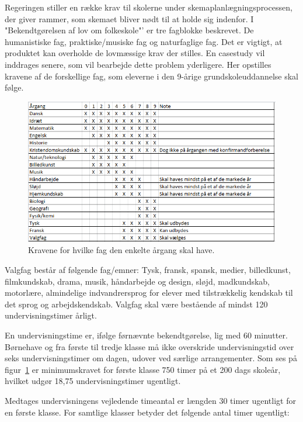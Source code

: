 Regeringen stiller en række krav til skolerne under skemaplanlægningsprocessen, der giver rammer, som skemaet bliver nødt til at holde sig indenfor. I "Bekendtgørelsen af lov om folkeskole"' er tre fagblokke beskrevet. De humanistiske fag, praktiske/musiske fag og naturfaglige fag. Det er vigtigt, at produktet kan overholde de lovmæssige krav der stilles. En casestudy vil inddrages senere, som vil bearbejde dette problem yderligere. Her opstilles kravene af de forskellige fag, som eleverne i den 9-årige grundskoleuddannelse skal følge.

\begin{figure}[!hb]
  \centering
  \includegraphics[width=\textwidth]{partials/graphics/fagkrav.png}
  \caption{Kravene for hvilke fag den enkelte årgang skal have.}
  \label{fig:Time}
\end{figure}

Valgfag består af følgende fag/emner: Tysk, fransk, spansk, medier, billedkunst, filmkundskab, drama, musik, håndarbejde og design, sløjd, madkundskab, motorlære, almindelige indvandrersprog for elever med tilstrækkelig kendskab til det sprog og arbejdskendskab. Valgfag skal være bestående af mindst 120 undervisningstimer årligt.

En undervisningstime er, ifølge førnævnte bekendtgørelse, lig med 60 minutter. Børnehave og fra første til tredje klasse må ikke overskride undervisningstid over seks undervisningstimer om dagen, udover ved særlige arrangementer. Som ses på figur~\ref{fig:Time} er minimumskravet for første klasse 750 timer på et 200 dags skoleår, hvilket udgør 18,75 undervisningstimer ugentligt.

Medtages undervisningens vejledende timeantal er længden 30 timer ugentligt for en første klasse. For samtlige klasser betyder det følgende antal timer ugentligt:

